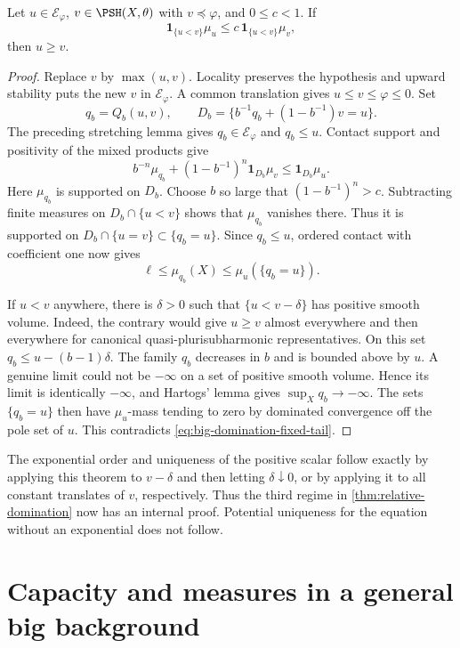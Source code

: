 \begin{theorem}\label{thm:big-relative-domination}
Let $u\in\mathcal E_\varphi$, $v\in\PSH(X,\theta)$ with $v\preceq\varphi$, and $0\leq c<1$. If
\[
 \mathbf1_{\{u<v\}}\mu_u\leq c\,\mathbf1_{\{u<v\}}\mu_v,
\]
then $u\geq v$.
\end{theorem}
\begin{proof}
Replace $v$ by $\max(u,v)$. Locality preserves the hypothesis and upward stability puts the new $v$ in $\mathcal E_\varphi$. A common translation gives $u\leq v\leq\varphi\leq0$. Set
\[
 q_b=Q_b(u,v),\qquad
 D_b=\{b^{-1}q_b+(1-b^{-1})v=u\}.
\]
The preceding stretching lemma gives $q_b\in\mathcal E_\varphi$ and $q_b\leq u$. Contact support and positivity of the mixed products give
\[
 b^{-n}\mu_{q_b}+(1-b^{-1})^n\mathbf1_{D_b}\mu_v
 \leq\mathbf1_{D_b}\mu_u.
\]
Here $\mu_{q_b}$ is supported on $D_b$. Choose $b$ so large that $(1-b^{-1})^n>c$. Subtracting finite measures on $D_b\cap\{u<v\}$ shows that $\mu_{q_b}$ vanishes there. Thus it is supported on $D_b\cap\{u=v\}\subset\{q_b=u\}$. Since $q_b\leq u$, ordered contact with coefficient one now gives
\begin{equation}\label{eq:big-domination-fixed-tail}
 \ell\leq\mu_{q_b}(X)\leq\mu_u(\{q_b=u\}).
\end{equation}

If $u<v$ anywhere, there is $\delta>0$ such that $\{u<v-\delta\}$ has positive smooth volume. Indeed, the contrary would give $u\geq v$ almost everywhere and then everywhere for canonical quasi-plurisubharmonic representatives. On this set
$q_b\leq u-(b-1)\delta$. The family $q_b$ decreases in $b$ and is bounded above by $u$. A genuine limit could not be $-\infty$ on a set of positive smooth volume. Hence its limit is identically $-\infty$, and Hartogs' lemma gives $\sup_Xq_b\to-\infty$. The sets $\{q_b=u\}$ then have $\mu_u$-mass tending to zero by dominated convergence off the pole set of $u$. This contradicts \eqref{eq:big-domination-fixed-tail}.
\end{proof}

The exponential order and uniqueness of the positive scalar follow exactly by applying this theorem to $v-\delta$ and then letting $\delta\downarrow0$, or by applying it to all constant translates of $v$, respectively. Thus the third regime in \cref{thm:relative-domination} now has an internal proof. Potential uniqueness for the equation without an exponential does not follow.

\section{Capacity and measures in a general big background}
\label{sec:big-relative-continuity}

